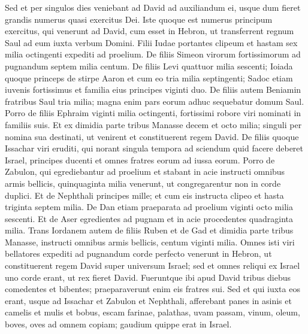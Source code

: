 \begin{biblechapter}
\begin{biblechapter}
\begin{biblechapter}
\begin{biblechapter}
\begin{biblechapter}
\begin{biblechapter}
\begin{biblechapter}
\begin{biblechapter}
\begin{biblechapter}
\begin{biblechapter}
\begin{biblechapter}
\begin{biblechapter}
\verse Sed et per singulos dies veniebant ad David ad auxiliandum ei, usque dum fieret grandis numerus quasi exercitus Dei.
 \verse Iste quoque est numerus principum exercitus, qui venerunt ad David, cum esset in Hebron, ut transferrent regnum Saul ad eum iuxta verbum Domini.
 \verse Filii Iudae portantes clipeum et hastam sex milia octingenti expediti ad proelium. 
\verse De filiis Simeon virorum fortissimorum ad pugnandum septem milia centum. 
\verse De filiis Levi quattuor milia sescenti; 
\verse Ioiada quoque princeps de stirpe Aaron et cum eo tria milia septingenti; 
\verse Sadoc etiam iuvenis fortissimus et familia eius principes viginti duo. 
\verse De filiis autem Beniamin fratribus Saul tria milia; magna enim pars eorum adhuc sequebatur domum Saul. 
\verse Porro de filiis Ephraim viginti milia octingenti, fortissimi robore viri nominati in familiis suis. 
\verse Et ex dimidia parte tribus Manasse decem et octo milia; singuli per nomina sua destinati, ut venirent et constituerent regem David. 
\verse De filiis quoque Issachar viri eruditi, qui norant singula tempora ad sciendum quid facere deberet Israel, principes ducenti et omnes fratres eorum ad iussa eorum. 
\verse Porro de Zabulon, qui egrediebantur ad proelium et stabant in acie instructi omnibus armis bellicis, quinquaginta milia venerunt, ut congregarentur non in corde duplici. 
\verse Et de Nephthali principes mille; et cum eis instructa clipeo et hasta triginta septem milia. 
\verse De Dan etiam praeparata ad proelium viginti octo milia sescenti. 
\verse Et de Aser egredientes ad pugnam et in acie procedentes quadraginta milia. 
\verse Trans Iordanem autem de filiis Ruben et de Gad et dimidia parte tribus Manasse, instructi omnibus armis bellicis, centum viginti milia.
 \verse Omnes isti viri bellatores expediti ad pugnandum corde perfecto venerunt in Hebron, ut constituerent regem David super universum Israel; sed et omnes reliqui ex Israel uno corde erant, ut rex fieret David. 
\verse Fueruntque ibi apud David tribus diebus comedentes et bibentes; praeparaverunt enim eis fratres sui. 
\verse Sed et qui iuxta eos erant, usque ad Issachar et Zabulon et Nephthali, afferebant panes in asinis et camelis et mulis et bobus, escam farinae, palathas, uvam passam, vinum, oleum, boves, oves ad omnem copiam; gaudium quippe erat in Israel.
 

\end{biblechapter}
\end{biblechapter}
\end{biblechapter}
\end{biblechapter}
\end{biblechapter}
\end{biblechapter}
\end{biblechapter}
\end{biblechapter}
\end{biblechapter}
\end{biblechapter}
\end{biblechapter}
\end{biblechapter}
